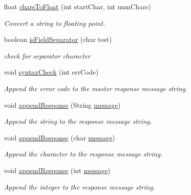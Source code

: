 float \hyperlink{_meditech___chip_kit_control_panel_8pde_ab87a8658559acd359f0eeec0e64a5af6}{chars\-To\-Float} (int start\-Char, int num\-Chars)
\begin{DoxyCompactList}\small\item\em Convert a string to floating point. \end{DoxyCompactList}\item 
boolean \hyperlink{_meditech___chip_kit_control_panel_8pde_a5e204e0bba8ab8ee2bde88215bf2ee53}{is\-Field\-Separator} (char test)
\begin{DoxyCompactList}\small\item\em check for separator character \end{DoxyCompactList}\item 
void \hyperlink{_meditech___chip_kit_control_panel_8pde_a586164a6eff90eab6ba87a6ca123770d}{syntax\-Check} (int err\-Code)
\begin{DoxyCompactList}\small\item\em Append the error code to the master response message string. \end{DoxyCompactList}\item 
void \hyperlink{_meditech___chip_kit_control_panel_8pde_afffcc2cca703b7a4d76c7f2dedd7266d}{append\-Response} (String \hyperlink{_meditech___chip_kit_control_panel_8pde_ae1956b5b6310b3339e72931911b84e3f}{message})
\begin{DoxyCompactList}\small\item\em Append the string to the response message string. \end{DoxyCompactList}\item 
void \hyperlink{_meditech___chip_kit_control_panel_8pde_ab4a96ab750b61d7410c41283cf17bac5}{append\-Response} (char \hyperlink{_meditech___chip_kit_control_panel_8pde_ae1956b5b6310b3339e72931911b84e3f}{message})
\begin{DoxyCompactList}\small\item\em Append the character to the response message string. \end{DoxyCompactList}\item 
void \hyperlink{_meditech___chip_kit_control_panel_8pde_a4d7e4234d7256ea1f3cca5fd420c84da}{append\-Response} (int \hyperlink{_meditech___chip_kit_control_panel_8pde_ae1956b5b6310b3339e72931911b84e3f}{message})
\begin{DoxyCompactList}\small\item\em Append the integer to the response message string. \end{DoxyCompactList}\item 
